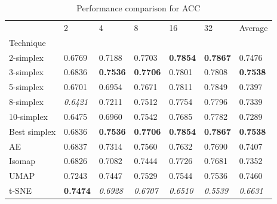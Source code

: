 \begin{table}
\caption{Performance comparison for ACC}
\label{tab:results_acc}
\begin{center}
\begin{tabular}{lllllll}
\toprule
 & 2 & 4 & 8 & 16 & 32 & Average \\
Technique &  &  &  &  &  &  \\
\midrule
2-simplex & 0.6769 & 0.7188 & 0.7703 & \textbf{0.7854} & \textbf{0.7867} & 0.7476 \\
3-simplex & 0.6836 & \textbf{0.7536} & \textbf{0.7706} & 0.7801 & 0.7808 & \textbf{0.7538} \\
5-simplex & 0.6701 & 0.6954 & 0.7671 & 0.7811 & 0.7849 & 0.7397 \\
8-simplex & \textit{0.6421} & 0.7211 & 0.7512 & 0.7754 & 0.7796 & 0.7339 \\
10-simplex & 0.6475 & 0.6960 & 0.7542 & 0.7685 & 0.7782 & 0.7289 \\
Best simplex & 0.6836 & \textbf{0.7536} & \textbf{0.7706} & \textbf{0.7854} & \textbf{0.7867} & \textbf{0.7538} \\
AE & 0.6837 & 0.7314 & 0.7560 & 0.7632 & 0.7690 & 0.7407 \\
Isomap & 0.6826 & 0.7082 & 0.7444 & 0.7726 & 0.7681 & 0.7352 \\
UMAP & 0.7243 & 0.7447 & 0.7529 & 0.7544 & 0.7536 & 0.7460 \\
t-SNE & \textbf{0.7474} & \textit{0.6928} & \textit{0.6707} & \textit{0.6510} & \textit{0.5539} & \textit{0.6631} \\
\bottomrule
\end{tabular}
\end{center}
\end{table}


